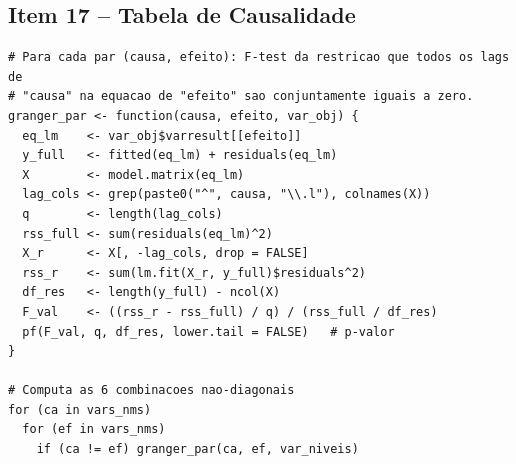 \documentclass[12pt,a4paper]{article}
\begin{document}
\subsection{Item 17 -- Tabela de Causalidade}

\begin{lstlisting}[caption={Granger par-a-par: F-test por equação (base R, Toda-Yamamoto)}]
# Para cada par (causa, efeito): F-test da restricao que todos os lags de
# "causa" na equacao de "efeito" sao conjuntamente iguais a zero.
granger_par <- function(causa, efeito, var_obj) {
  eq_lm    <- var_obj$varresult[[efeito]]
  y_full   <- fitted(eq_lm) + residuals(eq_lm)
  X        <- model.matrix(eq_lm)
  lag_cols <- grep(paste0("^", causa, "\\.l"), colnames(X))
  q        <- length(lag_cols)
  rss_full <- sum(residuals(eq_lm)^2)
  X_r      <- X[, -lag_cols, drop = FALSE]
  rss_r    <- sum(lm.fit(X_r, y_full)$residuals^2)
  df_res   <- length(y_full) - ncol(X)
  F_val    <- ((rss_r - rss_full) / q) / (rss_full / df_res)
  pf(F_val, q, df_res, lower.tail = FALSE)   # p-valor
}

# Computa as 6 combinacoes nao-diagonais
for (ca in vars_nms)
  for (ef in vars_nms)
    if (ca != ef) granger_par(ca, ef, var_niveis)
\end{lstlisting}

\begin{table}[H]
\centering
\caption{Causalidade de Granger par-a-par --- $F(2,\,151)$ e $p$-valor
         ($H_0$: causa não Granger-causa o efeito indicado na coluna)}
\label{tab:granger}
\end{table}
\end{document}

